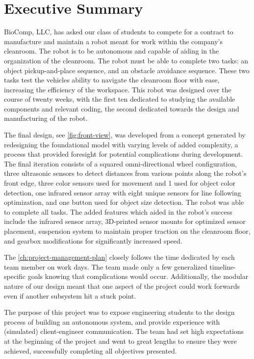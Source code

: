 \documentclass[11pt]{report}
\begin{document}
\chapter*{Executive Summary}
BioComp, LLC, has asked our class of students to compete for a contract to manufacture and maintain a robot meant for work within the company's cleanroom. The robot is to be autonomous and capable of aiding in the organization of the cleanroom. The robot must be able to complete two tasks: an object pickup-and-place sequence, and an obstacle avoidance sequence. These two tasks test the vehicles ability to navigate the cleanroom floor with ease, increasing the efficiency of the workspace. This robot was designed over the course of twenty weeks, with the first ten dedicated to studying the available components and relevant coding, the second dedicated towards the design and manufacturing of the robot.
\par The final design, see \cref{fig:front-view}, was developed from a concept generated by redesigning the foundational model with varying levels of added complexity, a process that provided foresight for potential complications during development. The final iteration consists of a squared omni-directional wheel configuration, three ultrasonic sensors to detect distances from various points along the robot's front edge, three color sensors used for movement and 1 used for object color detection, one infrared sensor array with eight unique sensors for line following optimization, and one button used for object size detection. The robot was able to complete all tasks. The added features which aided in the robot's success include the infrared sensor array, 3D-printed sensor mounts for optimized sensor placement, suspension system to maintain proper traction on the cleanroom floor, and gearbox modifications for significantly increased speed.
\par The \cref{ch:project-management-plan} closely follows the time dedicated by each team member on work days. The team made only a few generalized timeline-specific goals knowing that complications would occur. Additionally, the modular nature of our design meant that one aspect of the project could work forwards even if another subsystem hit a stuck point.
\par The purpose of this project was to expose engineering students to the design process of building an autonomous system, and provide experience with (simulated) client-engineer communication. The team had set high expectations at the beginning of the project and went to great lengths to ensure they were achieved, successfully completing all objectives presented.
\end{document}
